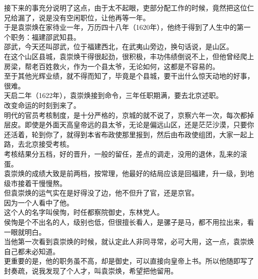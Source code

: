 \begin{multicols}{\theparacolNo}
接下来的事充分说明了这点，由于太不起眼，吏部分配工作的时候，竟然把这位仁兄给漏了，说是没有空闲职位，让他再等一年。\\

于是袁崇焕在家待业一年，万历四十八年（1620年），他终于得到了人生中的第一个职务：福建邵武知县。\\

邵武，今天还叫邵武，位于福建西北，在武夷山旁边，换句话说，是山区。\\

在这个山区县城，袁崇焕干得很起劲，很积极，丰功伟绩倒说不上，但他曾经爬上房梁，帮老百姓救火，作为一个县太爷，无论如何，这都是不容易的。\\

至于其他光辉业绩，就不得而知了，毕竟是个县城，要干出什么惊天动地的好事，很难。\\

天启二年（1622年），袁崇焕接到命令，三年任职期满，要去北京述职。\\

改变命运的时刻到来了。\\

明代的官员考核制度，是十分严格的，京城的就不说了，京察六年一次，每次都掉层皮。即使是外面天高皇帝远的县太爷，无论是偏远山区，还是茫茫沙漠，只要你还活着，轮到你了，就得到本省布政使那里报到，然后由布政使组团，大家一起上路，去北京接受考核。\\

考核结果分五档，好的晋升，一般的留任，差点的调走，没用的退休，乱来的滚蛋。\\

袁崇焕的成绩大致是前两档，按常理，他最好的结局应该是回福建，升一级，到地级市接着干慢慢熬。\\

但袁崇焕的运气实在是好得没了边，他不但升了官，还是京官。\\

因为一个人看中了他。\\

这个人的名字叫侯恂，时任都察院御史，东林党人。\\

侯恂是个不出名的人，级别也低，但很擅长看人，是骡子是马，都不用拉出来，看一眼就明白。\\

当他第一次看到袁崇焕的时候，就认定此人非同寻常，必可大用，这一点，袁崇焕自己都未必知道。\\

更重要的是，他的职务虽不高，却是御史，可以直接向皇帝上书。所以他随即写了封奏疏，说我发现了个人才，叫袁崇焕，希望把他留用。\\


\end{multicols}
